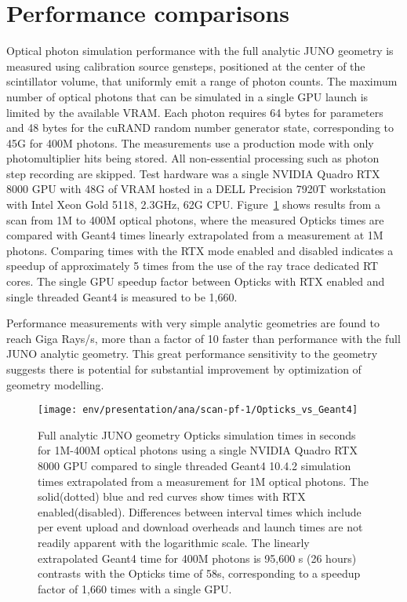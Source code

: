 \documentclass{webofc}
\begin{document}
\section{Performance comparisons}

Optical photon simulation performance with the full analytic JUNO geometry is measured 
using calibration source gensteps, positioned at the center of the scintillator volume, 
that uniformly emit a range of photon counts. 
The maximum number of optical photons that can be simulated in a single GPU launch is
limited by the available VRAM. Each photon requires 64 bytes for parameters  
and 48 bytes for the cuRAND random number generator state, corresponding to 45G for 400M photons.
The measurements use a production mode with only photomultiplier hits being stored.
All non-essential processing such as photon step recording are skipped. Test hardware was a single 
NVIDIA Quadro RTX 8000 GPU with 48G of VRAM hosted in a DELL Precision 7920T workstation with 
Intel Xeon Gold 5118, 2.3GHz, 62G CPU. 
Figure~\ref{scanpf1vs} shows results from a scan from 1M to 400M optical photons, where the measured Opticks 
times are compared with Geant4 times linearly extrapolated from a measurement at 1M photons. 
Comparing times with the RTX mode enabled and disabled indicates a speedup of approximately 5 times
from the use of the ray trace dedicated RT cores.
The single GPU speedup factor between Opticks with RTX enabled and single threaded Geant4 
is measured to be 1,660.   

Performance measurements with very simple analytic geometries are found to reach Giga Rays/s, 
more than a factor of 10 faster than performance with the full JUNO analytic geometry. 
This great performance sensitivity to the geometry suggests there is potential for 
substantial improvement by optimization of geometry modelling. 
%
\begin{figure}
\centering
\texttt{[image: env/presentation/ana/scan-pf-1/Opticks\_vs\_Geant4]}
\caption{Full analytic JUNO geometry Opticks simulation times in seconds for 1M-400M optical photons using a single NVIDIA Quadro RTX 8000 GPU 
compared to single threaded Geant4 10.4.2 simulation times extrapolated from a measurement for 1M optical photons. 
The solid(dotted) blue and red curves show times with RTX enabled(disabled). 
Differences between interval times which include per event upload and download overheads and launch 
times are not readily apparent with the logarithmic scale. The linearly extrapolated Geant4 time for 400M photons is 95,600 s (26 hours) 
contrasts with the Opticks time of 58s, corresponding to a speedup factor of 1,660 times with a single GPU.%
}
\label{scanpf1vs} 
\end{figure}
%
%
%
\end{document}
